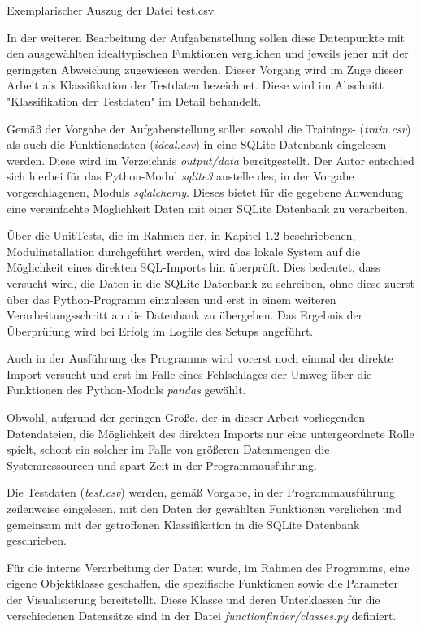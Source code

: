 \begin{table}[H]
\small
\centering
{}
\caption{Exemplarischer Auszug der Datei test.csv}
\label{tab:test.csv}
\end{table} 

In der weiteren Bearbeitung der Aufgabenstellung sollen diese Datenpunkte mit den ausgewählten idealtypischen Funktionen verglichen und jeweils jener mit der geringsten Abweichung zugewiesen werden. Dieser Vorgang wird im Zuge dieser Arbeit als Klassifikation der Testdaten bezeichnet. Diese wird im Abschnitt "Klassifikation der Testdaten" im Detail behandelt.

Gemäß der Vorgabe der Aufgabenstellung sollen sowohl die Trainings- (\emph{train.csv}) als auch die Funktionsdaten (\emph{ideal.csv}) in eine SQLite Datenbank eingelesen werden. Diese wird im Verzeichnis \emph{output/data} bereitgestellt. Der Autor entschied sich hierbei für das Python-Modul \emph{sqlite3} anstelle des, in der Vorgabe vorgeschlagenen, Moduls \emph{sqlalchemy}. Dieses bietet für die gegebene Anwendung eine vereinfachte Möglichkeit Daten mit einer SQLite Datenbank zu verarbeiten.

Über die UnitTests, die im Rahmen der, in Kapitel 1.2 beschriebenen, Modulinstallation durchgeführt werden, wird das lokale System auf die Möglichkeit eines direkten SQL-Imports hin überprüft. Dies bedeutet, dass versucht wird, die Daten in die SQLite Datenbank zu schreiben, ohne diese zuerst über das Python-Programm einzulesen und erst in einem weiteren Verarbeitungsschritt an die Datenbank zu übergeben. Das Ergebnis der Überprüfung wird bei Erfolg im Logfile des Setups angeführt. 

Auch in der Ausführung des Programms wird vorerst noch einmal der direkte Import versucht und erst im Falle eines Fehlschlages der Umweg über die Funktionen des Python-Moduls \emph{pandas} gewählt.

Obwohl, aufgrund der geringen Größe, der in dieser Arbeit vorliegenden Datendateien, die Möglichkeit des direkten Imports nur eine untergeordnete Rolle spielt, schont ein solcher im Falle von größeren Datenmengen die Systemressourcen und spart Zeit in der Programmausführung.

Die Testdaten (\emph{test.csv}) werden, gemäß Vorgabe, in der Programmausführung zeilenweise eingelesen, mit den Daten der gewählten Funktionen verglichen und gemeinsam mit der getroffenen Klassifikation in die SQLite Datenbank geschrieben.

Für die interne Verarbeitung der Daten wurde, im Rahmen des Programms, eine eigene Objektklasse geschaffen, die spezifische Funktionen sowie die Parameter der Visualisierung bereitstellt. Diese Klasse und deren Unterklassen für die verschiedenen Datensätze sind in der Datei \emph{functionfinder/classes.py} definiert.

